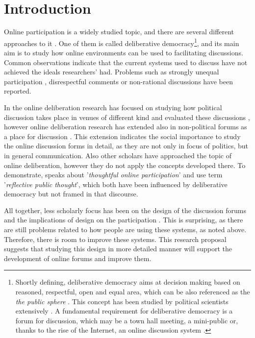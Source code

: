 \documentclass{article}
\begin{document}
\section{Introduction}

Online participation is a widely studied topic, and there are several different approaches to it . One of them is called deliberative democracy\footnote{Shortly defining, deliberative democracy aims at decision making based on reasoned, respectful, open and equal area, which can be also referenced as the \textit{the public sphere} \cite{habermas87,fiskin91,cohen97}. This concept has been studied by political scientists extensively . A fundamental requirement for deliberative democracy is a forum for discussion, which may be a town hall meeting, a mini-public or, thanks to the rise of the Internet, an online discussion system .}, and its main aim is to study how online environments can be used to facilitating discussions. Common observations indicate that the current systems used to discuss have not achieved the ideals researchers' had. Problems such as strongly unequal participation , disrespectful comments or non-rational discussions  have been reported.


In the online deliberation research has focused on studying how political discussion takes place in venues of different kind  and evaluated these discussions , however online deliberation research has extended also in non-political forums as a place for discussion \cite{graham12}. This extension indicates the social importance to study the online discussion forms in detail, as they are not only in focus of politics, but in general communication. Also other scholars have approached the topic of online deliberation, however they do not apply the concepts developed there. To demonstrate,  speaks about '\textit{thoughtful online participation}' and  use term '\textit{reﬂective public thought}', which both have been influenced by deliberative democracy but not framed in that discourse.

All together, less scholarly focus has been on the design of the discussion forums and the implications of design on the participation . This is surprising, as there are still problems related to how people are using these systems, as noted above. Therefore, there is room to improve these systems. This research proposal suggests that studying this design in more detailed manner will support the development of online forums and improve them.
\end{document}
